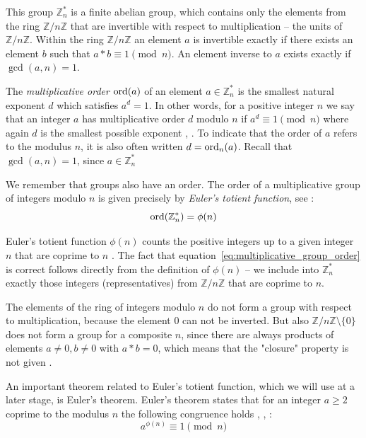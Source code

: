 This group $\mathbb{Z}_n^\ast$ is a finite abelian group, which contains only the elements from the ring $\mathbb{Z}/n\mathbb{Z}$ that are invertible with respect to multiplication -- the units of $\mathbb{Z}/n\mathbb{Z}$. Within the ring $\mathbb{Z}/n\mathbb{Z}$ an element $a$ is invertible exactly if there exists an element $b$ such that $a*b\equiv1\pmod n$. An element inverse to $a$ exists exactly if $\gcd(a,n)=1$.

The \textit{multiplicative order} $\operatorname{ord}(a)$ of an element $a\in\mathbb{Z}_n^\ast$ is the smallest natural exponent $d$ which satisfies $a^d=1$. In other words, for a positive integer $n$ we say that an integer $a$ has multiplicative order $d$ modulo $n$ if $a^d\equiv1\pmod n$ where again $d$ is the smallest possible exponent \cite[p.~76]{Ref_Hutz_2018}, \cite[p.~32]{Ref_Shoup_2008}. To indicate that the order of $a$ refers to the modulus $n$, it is also often written $d=\operatorname{ord}_n(a)$. Recall that $\gcd(a,n)=1$, since $a\in\mathbb{Z}_n^\ast$

We remember that groups also have an order. The order of a multiplicative group of integers modulo $n$ is given precisely by \textit{Euler's totient function}, see \cite[p.~27]{Ref_Wolfart_2011}:
\begin{equation}
\label{eq:multiplicative_group_order}
\operatorname{ord}(\mathbb{Z}_n^\ast)=\phi(n)
\end{equation}

Euler's totient function $\phi(n)$ counts the positive integers up to a given integer $n$ that are coprime to $n$ \cite[p.~49]{Ref_Forster_2015}. The fact that equation~\ref{eq:multiplicative_group_order} is correct follows directly from the definition of $\phi(n)$ -- we include into $\mathbb{Z}_n^\ast$ exactly those integers (representatives) from $\mathbb{Z}/n\mathbb{Z}$ that are coprime to $n$.

\begin{remark}
The elements of the ring of integers modulo $n$ do not form a group with respect to multiplication, because the element $0$ can not be inverted. But also $\mathbb{Z}/n\mathbb{Z}\setminus\{0\}$ does not form a group for a composite $n$, since there are always products of elements $a\ne0,b\ne0$ with $a*b=0$, which means that the "closure" property is not given \cite{Ref_Schwalen_2014}.
\end{remark}

An important theorem related to Euler's totient function, which we will use at a later stage, is Euler's theorem. Euler's theorem states that for an integer $a\ge2$ coprime to the modulus $n$ the following congruence holds \cite[p.~37]{Ref_Mueller-Stach_2011}, \cite[p.~56]{Ref_Forster_2015}, \cite[p.~104]{Ref_Teschl_2013}:
\begin{equation}
\label{eq:eulers_theorem}
a^{\phi(n)}\equiv1\pmod n
\end{equation}

